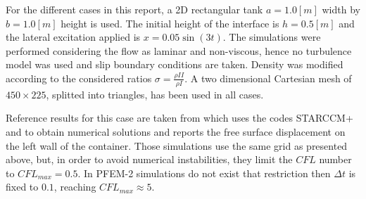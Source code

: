 For the different cases in this report, a 2D rectangular tank $a=1.0[m]$ width by $b=1.0[m]$ height is used. The initial height of the interface is $h=0.5[m]$ and the lateral excitation applied is $x=0.05\sin(3t)$. The simulations were performed considering the
flow as laminar and non-viscous, hence no turbulence model was used and slip boundary conditions are taken. Density was modified according to the considered ratios $\sigma=\frac{\rho{II}}{\rho{I}}$. A two dimensional Cartesian mesh of $450\times225$, splitted into triangles, has been used in all cases.

Reference results for this case are taken from \cite{Goni13} which uses the codes STARCCM+ and \OF to obtain numerical solutions and reports the free surface displacement on the left wall of the container. Those simulations use the same grid as presented above, but, in order to avoid numerical instabilities, they limit the $CFL$ number to $CFL_{max}=0.5$. In PFEM-2 simulations do not exist that restriction then $\Delta t$ is fixed to $0.1$, reaching $CFL_{max}\approx5$.

